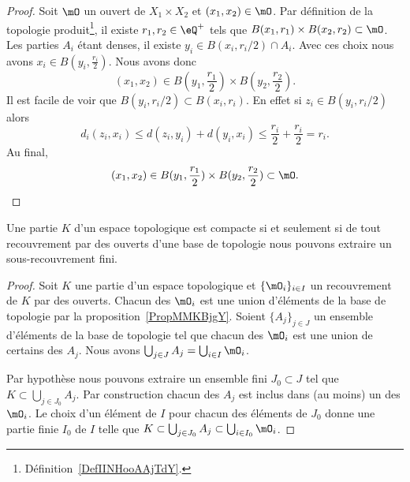 \begin{proof}
    Soit \( \mO\) un ouvert de \( X_1\times X_2\) et \( (x_1,x_2)\in \mO\). Par définition de la topologie produit\footnote{Définition~\ref{DefIINHooAAjTdY}.}, il existe \( r_1,r_2\in \eQ^+\) tels que \( B(x_1,r_1)\times B(x_2,r_2)\subset\mO\). Les parties \( A_i\) étant denses, il existe \( y_i\in B(x_i,r_i/2)\cap A_i\). Avec ces choix nous avons $x_i\in B(y_i,\frac{ r_i }{2})$. Nous avons donc
    \begin{equation}
        (x_1,x_2)\in B(y_1,\frac{ r_1 }{ 2 })\times B(y_2,\frac{ r_2 }{2}).
    \end{equation}
    Il est facile de voir que \( B(y_i,r_i/2)\subset B(x_i,r_i)\). En effet si \( z_i\in B(y_i,r_i/2)\) alors
    \begin{equation}
        d_i(z_i,x_i)\leq d(z_i,y_i)+d(y_i,x_i)\leq \frac{ r_i }{2}+\frac{ r_i }{2}=r_i.
    \end{equation}
    Au final,
    \begin{equation}
        (x_1,x_2)\in B(y_1,\frac{ r_1 }{ 2 })\times B(y_2,\frac{ r_2 }{2})\subset \mO.
    \end{equation}
\end{proof}

\begin{lemma}   \label{LemOWVooZKndbI}
    Une partie \( K\) d'un espace topologique est compacte si et seulement si de tout recouvrement par des ouverts d'une base de topologie nous pouvons extraire un sous-recouvrement fini.
\end{lemma}

\begin{proof}
    Soit \( K\) une partie d'un espace topologique et \( \{ \mO_i \}_{i\in I}\) un recouvrement de \( K\) par des ouverts. Chacun des \( \mO_i\) est une union d'éléments de la base de topologie par la proposition~\ref{PropMMKBjgY}. Soient \( \{ A_j \}_{j\in J}\) un ensemble d'éléments de la base de topologie tel que chacun des \( \mO_i\) est une union de certains des \( A_j\). Nous avons \( \bigcup_{j\in J}A_j=\bigcup_{i\in I}\mO_i\).

    Par hypothèse nous pouvons extraire un ensemble fini \( J_0\subset J\) tel que \( K\subset\bigcup_{j\in J_0}A_j\). Par construction chacun des \( A_j\) est inclus dans (au moins) un des \( \mO_i\). Le choix d'un élément de \( I\) pour chacun des éléments de \( J_0\) donne une partie finie \( I_0\) de \( I\) telle que \( K\subset\bigcup_{j\in J_0}A_j\subset\bigcup_{i\in I_0}\mO_i\).
\end{proof}
